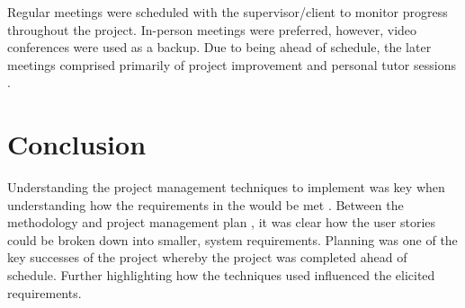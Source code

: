 Regular meetings were scheduled with the supervisor/client to monitor progress throughout the project. In-person meetings were preferred, however, video conferences were used as a backup. Due to being ahead of schedule, the later meetings comprised primarily of project improvement and personal tutor sessions .

\section{Conclusion}
\label{pm:conclusion}

Understanding the project management techniques to implement was key when understanding how the requirements in the would be met . Between the methodology  and project management plan , it was clear how the user stories could be broken down into smaller, system requirements. Planning was one of the key successes of the project whereby the project was completed ahead of schedule. Further highlighting how the techniques used influenced the elicited requirements.